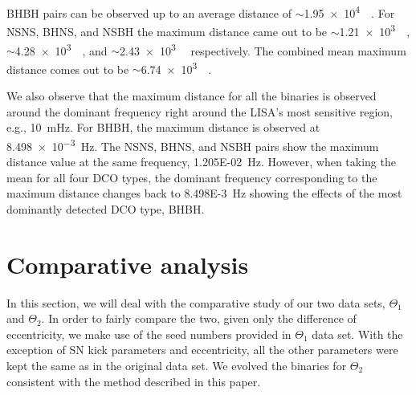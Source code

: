 \documentclass[journal, twocolumns]{IEEEtran}
\newcommand{\kpc}{\kilo\parsec}
\newcommand{\scientific}[2]{\SI[scientific-notation=engineering, exponent-to-prefix]{#1}{#2}}
\begin{document}
    BHBH pairs can be observed up to an average distance of $\sim$\scientific{1.95e4}{\kpc}.
    For NSNS, BHNS, and NSBH the maximum distance came out to be $\sim$\scientific{1.21e3}{\kpc}, $\sim$\scientific{4.28e3}{\kpc}, and $\sim$\scientific{2.43e3}{\kpc} respectively.
    The combined mean maximum distance comes out to be $\sim$\scientific{6.74e3}{\kpc}.

	We also observe that the maximum distance for all the binaries is observed around the dominant frequency right around the LISA's most sensitive region, e.g., \scientific{10}{\milli\hertz}.
	For BHBH, the maximum distance is observed at \scientific{8.498e-3}{\hertz}.
	The NSNS, BHNS, and NSBH pairs show the maximum distance value at the same frequency, \scientific{1.205E-02}{\hertz}.
	However, when taking the mean for all four DCO types, the dominant frequency corresponding to the maximum distance changes back to \scientific{8.498E-3}{\hertz} showing the effects of the most dominantly detected DCO type, BHBH.

    \section{Comparative analysis}
    \label{sec:comparative-analysis}
    In this section, we will deal with the comparative study of our two data sets, $\Theta_1$ and $\Theta_2$.
    In order to fairly compare the two, given only the difference of eccentricity, we make use of the seed numbers provided in $\Theta_1$ data set.
    With the exception of SN kick parameters and eccentricity, all the other parameters were kept the same as in the original data set.
    We evolved the binaries for $\Theta_2$ consistent with the method described in this paper.
\end{document}
